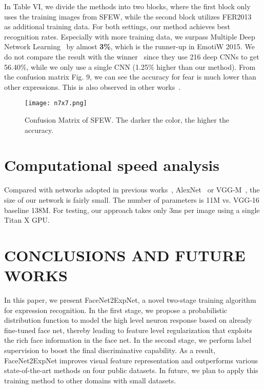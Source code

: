 \documentclass[a4paper, 10pt, conference]{ieeeconf}      %
\begin{document}
In Table VI, we divide the methods into two blocks, where the first block only uses the training images from SFEW, while the second block utilizes FER2013~\cite{goodfellow2013challenges} as additional training data.
For both settings, our method achieves best recognition rates. Especially with more training data, we surpass Multiple Deep Network Learning~\cite{yu2015image} by almost \textbf{3\%}, which is the runner-up in EmotiW 2015. We do not compare the result with the winner~\cite{kim2016hierarchical} since they use 216 deep CNNs to get 56.40\%, while we only use a single CNN (1.25\% higher than our method). From the confusion matrix Fig. 9, we can see the accuracy for fear is much lower than other expressions. This is also observed in other works~\cite{ng2015deep}. 

\begin{figure}[!ht]
  \centering
  \texttt{[image: n7x7.png]}
  \caption{Confusion Matrix of SFEW. The darker the color, the higher the accuracy.}
  \label{figurelabel}
  \vspace{-1mm}
\end{figure}







\section{Computational speed analysis}
Compared with networks adopted in previous works~\cite{ng2015deep, mollahosseini2016going, zhao2016peak}, AlexNet~\cite{krizhevsky2012imagenet} or  VGG-M~\cite{chatfield2014return}, the size of our network is fairly small. The number of parameters is 11M vs. VGG-16 baseline 138M. For testing, our approach takes only 3ms per image using a single Titan X GPU. 



\section{CONCLUSIONS AND FUTURE WORKS}



In this paper, we present FaceNet2ExpNet, a novel two-stage training algorithm for expression recognition. 
In the first stage, we propose a probabilistic distribution function to model the high level neuron response based on already fine-tuned face net, thereby leading to feature level regularization that exploits the rich face information in the face net. In the second stage, we perform label supervision to boost the final discriminative capability. As a result, FaceNet2ExpNet improves visual feature representation and outperforms various state-of-the-art methods on four public datasets. In future, we plan to apply this training method to other domains with small datasets.
\end{document}
